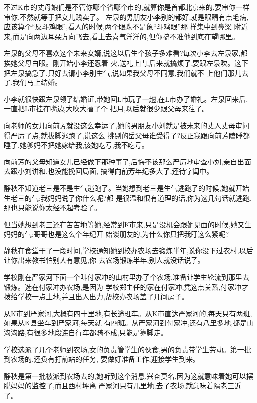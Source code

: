 ﻿\documentclass[12pt]{article}
\begin{document}
不过K市的丈母娘们是不管你哪个省哪个市的,就算你是首都北京来的,要审你一样审你,不然就等于把女儿贱卖了。
左泉的男朋友小李别的都好,就是眼睛有点毛病,应该算个``反斗鸡眼'',看人的时候,两个眼珠不是象``斗鸡眼''那
样集中到鼻梁 附近来,而是向两边耳朵方向飞去,看上去喜气洋洋的,但你搞不准他到底在望哪里。

左泉的父母不喜欢这个未来女婿,说这以后生个孩子多难看?每次小李去左泉家,都挨她父母白眼。刚开始小李还忍着
火,送礼上门,后来就搞烦了,要跟左泉吹。这下把左泉搞急了,只好去请小李别生气,说如果我父母不同意,我们就不
上他们那儿去了,我们马上结婚。

小李就很快跟左泉领了结婚证,带她回L市玩了一趟,在L市办了婚礼。左泉回来后,一直把L市挂在嘴边,大吹大擂了个
把月,以后就很少跟父母来往了。

向老师的女儿向前芳就没这么幸运了,她的男朋友小刘就是被未来的丈人丈母审问得严厉了点,就拔脚逃跑了,说这么
挑剔的岳父母谁受得了?反正我跟向前芳瞌睡都睡了,她爹妈不把她嫁给我,该她吃亏,我不吃亏。

向前芳的父母知道女儿已经做下那种事了,后悔不该那么严厉地审查小刘,亲自出面去跟小刘讲和,也没能挽回局面,
搞得向前芳年纪多大了,还待字闺中。

静秋不知道老三是不是生气逃跑了。当她想到老三是生气逃跑了的时候,她就开始生老三的气:我妈妈说了你什么呢?都
是很温和很有道理的话,你为这几句话就逃跑,那也只能说你太经不起考验了。

但当她想到老三还在苦苦地等她,经常到K市来,只是没机会跟她见面的时候,她又生妈妈的气:哥哥也是这么个年纪开
始谈朋友的,为什么你只把我盯这么紧呢?

静秋在食堂干了一段时间,学校通知她到校办农场去锻炼半年,说你没下过农村,以后让你出来教书怕别人有意见,你
去农场锻炼半年,别人就没话说了。

学校刚在严家河下面一个叫付家冲的山村里办了个农场,准备让学生轮流到那里去锻炼。选在付家冲办农场,是因为
学校郑主任的家在付家冲,凭这点关系,付家冲才拨给学校一点土地,并且出人出力,帮校办农场盖了几间房子。

从K市到严家河,大概有四十里地,有长途班车。从K市直达严家河的,每天只有两班,如果从K县坐车到严家河,每天就
有四班。从严家河到付家冲,还有八里多地,都是山沟沟路,有很多地段连自行车都骑不成,只能是靠脚走。

学校选派了几个老师到农场,女的负责管学生的伙食,男的负责带学生劳动。第一批到农场的,还负有打前站的任务,
要做好准备工作,迎接学生到来。

静秋是第一批被派到农场去的,她听到这个消息,兴奋莫名,因为这就意味着她可以摆脱妈妈的监控了,而且西村坪离
严家河只有几里地,去了农场,就意味着隔老三近了。
\end{document}
